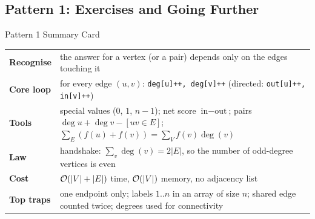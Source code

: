\subsection{Pattern 1: Exercises and Going Further}
\label{ssec:ch1-p1-ex}

\begin{patternbox}{Pattern 1 Summary Card}
\begin{tabularx}{\linewidth}{@{}>{\bfseries}l X@{}}
Recognise & the answer for a vertex (or a pair) depends only on the edges touching it \\
Core loop & for every edge $(u,v)$: \texttt{deg[u]++, deg[v]++} \;(directed: \texttt{out[u]++, in[v]++}) \\
Tools & special values ($0$, $1$, $n-1$); net score $\text{in}-\text{out}$; pairs $\deg u + \deg v - [uv\in E]$; $\sum_{E}(f(u)+f(v)) = \sum_V f(v)\deg(v)$ \\
Law & handshake: $\sum_v \deg(v) = 2|E|$, so the number of odd-degree vertices is even \\
Cost & $\mathcal{O}(|V|+|E|)$ time, $\mathcal{O}(|V|)$ memory, no adjacency list \\
Top traps & one endpoint only; labels $1..n$ in an array of size $n$; shared edge counted twice; degrees used for connectivity \\
\end{tabularx}
\end{patternbox}


